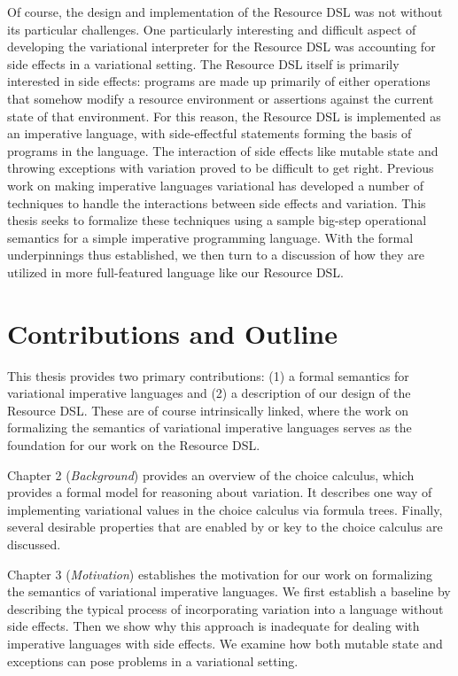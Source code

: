 \documentclass[12pt,oneside]{book}
\begin{document}
Of course, the design and implementation of the Resource DSL was not without its particular challenges. One particularly interesting and difficult aspect of developing
the variational interpreter for the Resource DSL was accounting for side effects in a variational setting. The Resource DSL itself is primarily interested in side effects: programs are
made up primarily of either operations that somehow modify a resource environment or assertions against the current state of that environment. For this reason, the
Resource DSL is implemented as an imperative language, with side-effectful statements forming the basis of programs in the language. The interaction of side effects
like mutable state and throwing exceptions with variation proved to be difficult to get right. Previous work on making imperative languages variational has developed a
number of techniques to handle the interactions between side effects and variation. This thesis seeks to formalize these techniques using a sample big-step operational
semantics for a simple imperative programming language. With the formal underpinnings thus established, we then turn to a discussion of how they are utilized in more
full-featured language like our Resource DSL.

\section{Contributions and Outline}
\label{sec:contrib}

This thesis provides two primary contributions: (1) a formal semantics for variational imperative languages
and (2) a description of our design of the Resource DSL. These are of course intrinsically linked, where
the work on formalizing the semantics of variational imperative languages serves as the foundation for
our work on the Resource DSL.

Chapter 2 (\emph{Background}) provides an overview of the choice calculus, which provides a formal
model for reasoning about variation. It describes one way of implementing variational values in the
choice calculus via formula trees. Finally, several desirable properties that are enabled by or
key to the choice calculus are discussed.

Chapter 3 (\emph{Motivation}) establishes the motivation for our work on formalizing
the semantics of variational imperative languages. We first establish
a baseline by describing the typical process of incorporating variation into
a language without side effects. Then we show why this approach is inadequate
for dealing with imperative languages with side effects. We examine how both
mutable state and exceptions can pose problems in a variational setting.
\end{document}

